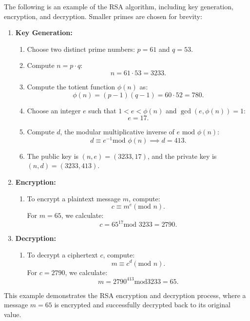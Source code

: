 \begin{Example}
    \label{ex:rsa_example}
    The following is an example of the RSA algorithm, including key generation, encryption, and decryption.
    Smaller primes are chosen for brevity:
    \begin{enumerate}
        \item \textbf{Key Generation:}
        \begin{enumerate}
            \item Choose two distinct prime numbers: $p = 61$ and $q = 53$.
            \item Compute $n = p \cdot q$:
            \[
            n = 61 \cdot 53 = 3233.
            \]
            \item Compute the totient function $\phi(n)$ as:
            \[
            \phi(n) = (p-1)(q-1) = 60 \cdot 52 = 780.
            \]
            \item Choose an integer $e$ such that $1 < e < \phi(n)$ and $\gcd(e, \phi(n)) = 1$:
            \[
            e = 17.
            \]
            \item Compute $d$, the modular multiplicative inverse of $e \text{ mod } \phi(n)$:
            \[
            d \equiv e^{-1} \text{mod } \phi(n) \implies d = 413.
            \]
            \item The public key is $(n, e) = (3233, 17)$, and the private key is $(n, d) = (3233, 413)$.
        \end{enumerate}
        
        \item \textbf{Encryption:}
        \begin{enumerate}
            \item To encrypt a plaintext message $m$, compute:
            \[
            c \equiv m^e (\text{mod } n).
            \]
            For $m = 65$, we calculate:
            \[
            c = 65^{17} \text{mod } 3233 = 2790.
            \]
        \end{enumerate}

        \item \textbf{Decryption:}
        \begin{enumerate}
            \item To decrypt a ciphertext $c$, compute:
            \[
            m \equiv c^d (\text{mod } n).
            \]
            For $c = 2790$, we calculate:
            \[
            m = 2790^{413} \text{mod} 3233 = 65.
            \]
        \end{enumerate}
    \end{enumerate}
    \noindent
    This example demonstrates the RSA encryption and decryption process,
    where a message $m = 65$ is encrypted and successfully decrypted back to its original value. \hfill{}
\end{Example}


